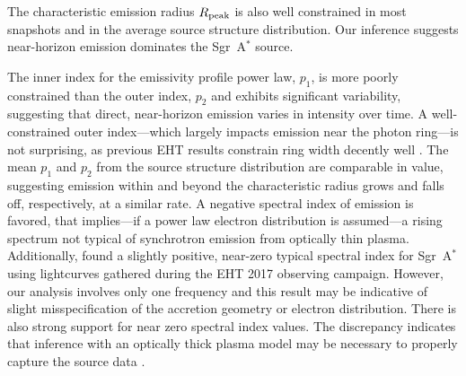 \documentclass[linenumbers, twocolumn, tighten]{aastex701}
\def\sgra{Sgr~A$^*$\xspace}
\begin{document}
The characteristic emission radius $R_{\rm peak}$ is also well constrained in most snapshots and in the average source structure distribution. Our inference suggests near-horizon emission dominates the \sgra source. 

The inner index for the emissivity profile power law, $p_1$, is more poorly constrained than the outer index, $p_2$ and exhibits significant variability, suggesting that direct, near-horizon emission varies in intensity over time. A well-constrained outer index---which largely impacts emission near the photon ring---is not surprising, as previous EHT results constrain ring width decently well . The mean $p_1$ and $p_2$ from the source structure distribution are comparable in value, suggesting emission within and beyond the characteristic radius grows and falls off, respectively, at a similar rate. A negative spectral index of emission is favored, that implies---if a power law electron distribution is assumed---a rising spectrum not typical of synchrotron emission from optically thin plasma. Additionally, \citealt{2022ApJ...930L..19W} found a slightly positive, near-zero typical spectral index for \sgra using lightcurves gathered during the EHT 2017 observing campaign. However, our analysis involves only one frequency and this result may be indicative of slight misspecification of the accretion geometry or electron distribution. There is also strong support for near zero spectral index values. The discrepancy indicates that inference with an optically thick plasma model may be necessary to properly capture the source data \citep[e.g.][]{Broderick_2016, 2018ApJ...863..148P}.
\end{document}
